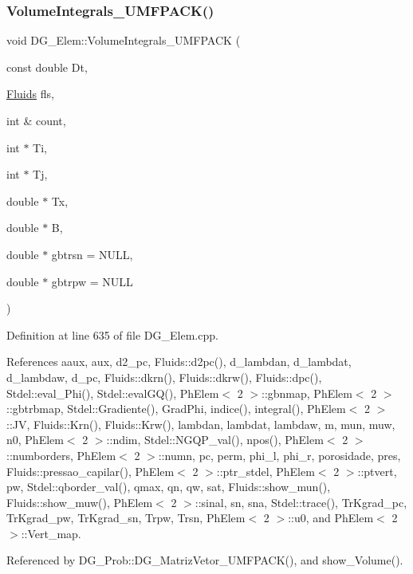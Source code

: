 \subsubsection{\texorpdfstring{Volume\+Integrals\+\_\+\+U\+M\+F\+P\+A\+C\+K()}{VolumeIntegrals\_UMFPACK()}}
{\footnotesize\ttfamily void D\+G\+\_\+\+Elem\+::\+Volume\+Integrals\+\_\+\+U\+M\+F\+P\+A\+CK (\begin{DoxyParamCaption}\item[{const double}]{Dt,  }\item[{\hyperlink{classFluids}{Fluids}}]{fls,  }\item[{int \&}]{count,  }\item[{int $\ast$}]{Ti,  }\item[{int $\ast$}]{Tj,  }\item[{double $\ast$}]{Tx,  }\item[{double $\ast$}]{B,  }\item[{double $\ast$}]{gbtrsn = {\ttfamily NULL},  }\item[{double $\ast$}]{gbtrpw = {\ttfamily NULL} }\end{DoxyParamCaption})}



Definition at line 635 of file D\+G\+\_\+\+Elem.\+cpp.



References aaux, aux, d2\+\_\+pc, Fluids\+::d2pc(), d\+\_\+lambdan, d\+\_\+lambdat, d\+\_\+lambdaw, d\+\_\+pc, Fluids\+::dkrn(), Fluids\+::dkrw(), Fluids\+::dpc(), Stdel\+::eval\+\_\+\+Phi(), Stdel\+::eval\+G\+Q(), Ph\+Elem$<$ 2 $>$\+::gbnmap, Ph\+Elem$<$ 2 $>$\+::gbtrbmap, Stdel\+::\+Gradiente(), Grad\+Phi, indice(), integral(), Ph\+Elem$<$ 2 $>$\+::\+JV, Fluids\+::\+Krn(), Fluids\+::\+Krw(), lambdan, lambdat, lambdaw, m, mun, muw, n0, Ph\+Elem$<$ 2 $>$\+::ndim, Stdel\+::\+N\+G\+Q\+P\+\_\+val(), npos(), Ph\+Elem$<$ 2 $>$\+::numborders, Ph\+Elem$<$ 2 $>$\+::numn, pc, perm, phi\+\_\+l, phi\+\_\+r, porosidade, pres, Fluids\+::pressao\+\_\+capilar(), Ph\+Elem$<$ 2 $>$\+::ptr\+\_\+stdel, Ph\+Elem$<$ 2 $>$\+::ptvert, pw, Stdel\+::qborder\+\_\+val(), qmax, qn, qw, sat, Fluids\+::show\+\_\+mun(), Fluids\+::show\+\_\+muw(), Ph\+Elem$<$ 2 $>$\+::sinal, sn, sna, Stdel\+::trace(), Tr\+Kgrad\+\_\+pc, Tr\+Kgrad\+\_\+pw, Tr\+Kgrad\+\_\+sn, Trpw, Trsn, Ph\+Elem$<$ 2 $>$\+::u0, and Ph\+Elem$<$ 2 $>$\+::\+Vert\+\_\+map.



Referenced by D\+G\+\_\+\+Prob\+::\+D\+G\+\_\+\+Matriz\+Vetor\+\_\+\+U\+M\+F\+P\+A\+C\+K(), and show\+\_\+\+Volume().

